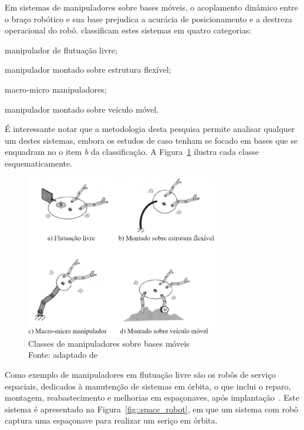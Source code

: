 Em sistemas de manipuladores sobre bases móveis, o acoplamento dinâmico entre o
braço robótico e sua base prejudica a acurácia de posicionamento e a destreza
operacional do robô. \citet{yoshida1996moving} classificam estes sistemas em
quatro categorias:
%
\begin{enumerate*}[label=\alph*)]
	\item manipulador de flutuação livre;
	\item manipulador montado sobre estrutura flexível;
	\item macro-micro manipuladores;
	\item manipulador montado sobre veículo móvel.
\end{enumerate*}
%
É interessante notar que a metodologia desta pesquisa permite analisar qualquer
um destes sistemas, embora os estudos de caso tenham se focado em bases que se
enquadram no o item \emph{b} da classificação. A Figura~\ref{fig::classes_bases}
ilustra cada classe esquematicamente.

\begin{figure}[h]
	\centering 
 	\includegraphics[width=0.75\textwidth]{figs/classes_bases}
 	\caption[Classes de manipuladores sobre bases móveis]{Classes de
 	manipuladores sobre bases móveis \\ Fonte: adaptado de
 	\cite{yoshida1996moving}}
 	\label{fig::classes_bases}
\end{figure}

Como exemplo de manipuladores em flutuação livre são os robôs de serviço
espaciais, dedicados à manutenção de sistemas em órbita, o que inclui
o reparo, montagem, reabastecimento e melhorias em espaçonaves, após
implantação~\cite{flores2014review}. Este sistema é apresentado na
Figura~\ref{fig::space_robot}, em que um sistema com robô captura uma
espaçonave  para realizar um seriço em órbita.

